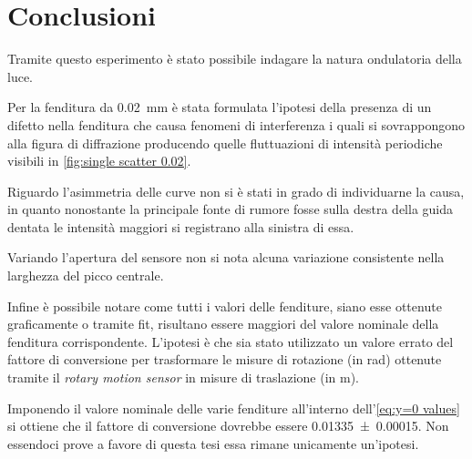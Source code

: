 \documentclass[../main.tex]{subfiles}
\begin{document}
\section{Conclusioni}

Tramite questo esperimento è stato possibile indagare la natura ondulatoria della luce.

Per la fenditura da \qty{0.02}{\mm} è stata formulata l'ipotesi della presenza di un difetto nella fenditura che causa fenomeni di interferenza i quali si sovrappongono alla figura di diffrazione producendo quelle fluttuazioni di intensità periodiche visibili in \autoref{fig:single scatter 0.02}.

Riguardo l'asimmetria delle curve non si è stati in grado di individuarne la causa, in quanto nonostante la principale fonte di rumore fosse sulla destra della guida dentata le intensità maggiori si registrano alla sinistra di essa.

Variando l'apertura del sensore non si nota alcuna variazione consistente nella larghezza del picco centrale.

Infine è possibile notare come tutti i valori delle fenditure, siano esse ottenute graficamente o tramite fit, risultano essere maggiori del valore nominale della fenditura corrispondente. L'ipotesi è che sia stato utilizzato un valore errato %
del fattore di conversione per trasformare le misure di rotazione (in \si{\radian}) ottenute tramite il \textit{rotary motion sensor} in misure di traslazione (in \si{\m}).

Imponendo il valore nominale delle varie fenditure all'interno dell'\autoref{eq:y=0 values} si ottiene che %
il fattore di conversione dovrebbe essere \num{0.01335+-0.00015}. Non essendoci prove a favore di questa tesi essa rimane unicamente un'ipotesi.
\end{document}
